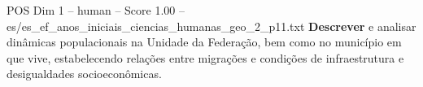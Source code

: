 \begin{textsample}{POS Dim 1 – human – Score 1.00 – es/es\_ef\_anos\_iniciais\_ciencias\_humanas\_geo\_2\_p11.txt}  \label{ex:f1_pos_016}
\textbf{Descrever} e analisar dinâmicas populacionais na Unidade da Federação, bem como no município em que vive, estabelecendo relações entre migrações e condições de infraestrutura e desigualdades socioeconômicas.

\end{textsample}
